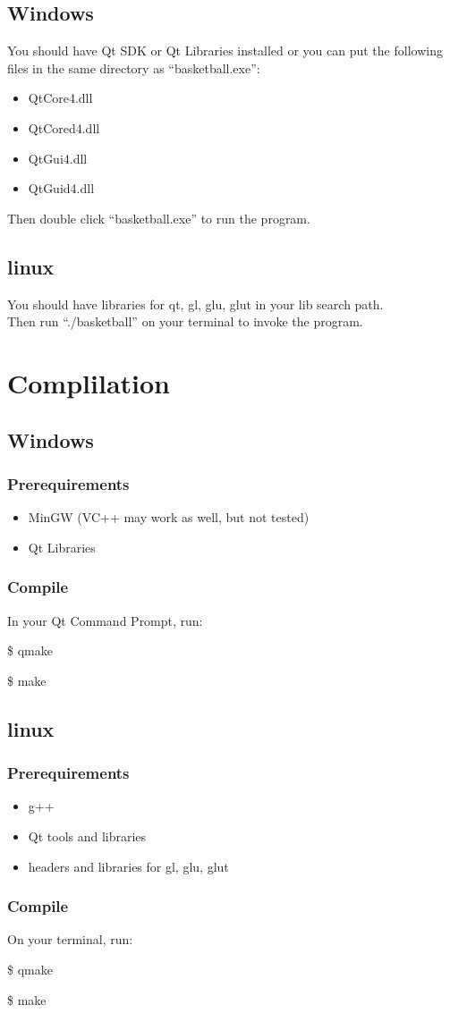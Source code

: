 \documentclass[10pt,a4paper]{article}
\begin{document}
\subsection{Windows}
You should have Qt SDK or Qt Libraries installed or you can put the following files in the same directory as ``basketball.exe'':
\begin{itemize}
\item QtCore4.dll
\item QtCored4.dll
\item QtGui4.dll
\item QtGuid4.dll
\end{itemize}

Then double click ``basketball.exe'' to run the program.

\subsection{linux}
You should have libraries for qt, gl, glu, glut in your lib search path.\\

Then run ``./basketball'' on your terminal to invoke the program.

\section{Complilation}
\subsection{Windows}
\subsubsection{Prerequirements}
\begin{itemize}
\item MinGW (VC++ may work as well, but not tested)
\item Qt Libraries
\end{itemize}
\subsubsection{Compile}
In your Qt Command Prompt, run:

\$ qmake

\$ make

\subsection{linux}
\subsubsection{Prerequirements}
\begin{itemize}
\item g++
\item Qt tools and libraries
\item headers and libraries for gl, glu, glut
\end{itemize}
\subsubsection{Compile}
On your terminal, run:

\$ qmake

\$ make
\end{document}
